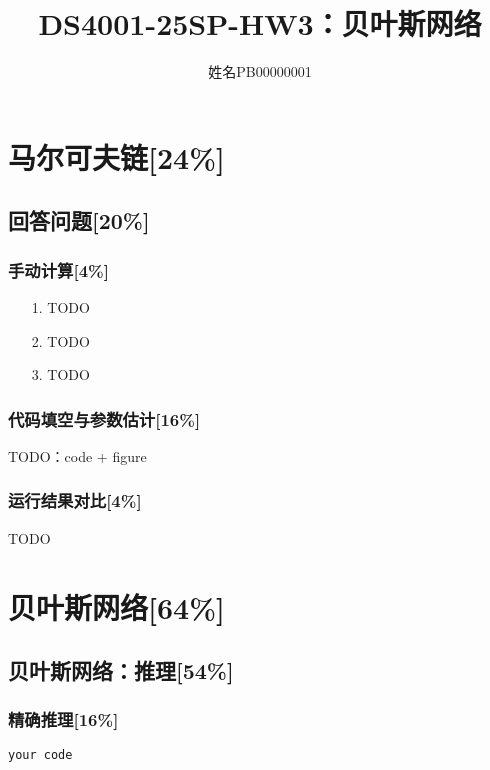 \documentclass{article}
\title{\bfseries DS4001-25SP-HW3：贝叶斯网络}
\author{姓名\quad PB00000001}
\begin{document}
\maketitle

\section{马尔可夫链[24\%]}
\subsection{回答问题[20\%]}
\subsubsection{手动计算[4\%]}

\begin{enumerate}
    
    \item[1.] TODO 
    
    \item[2.] TODO 

    \item[3.] TODO 

\end{enumerate}

\subsubsection{代码填空与参数估计[16\%]}
TODO：code + figure


\subsubsection{运行结果对比[4\%]}
TODO



\section{贝叶斯网络[64\%]}
\subsection{贝叶斯网络：推理[54\%]}
\subsubsection{精确推理[16\%]}

\begin{lstlisting}[language=Python]
your code
\end{lstlisting}
\end{document}
